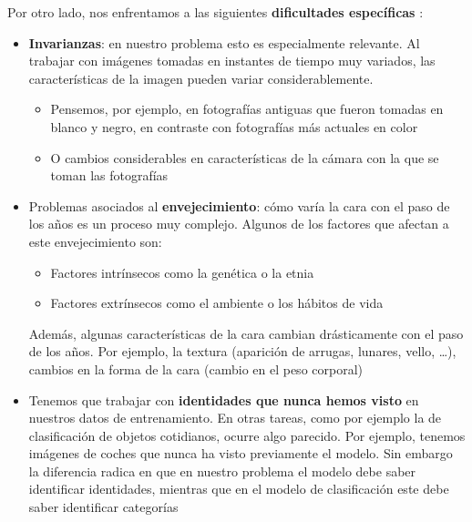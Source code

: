 Por otro lado, nos enfrentamos a las siguientes \textbf{dificultades específicas} \cite{informatica:challenges_retrieval}:

\begin{itemize}
    \item \textbf{Invarianzas}: en nuestro problema esto es especialmente relevante. Al trabajar con imágenes tomadas en instantes de tiempo muy variados, las características de la imagen pueden variar considerablemente.
        \begin{itemize}
            \item Pensemos, por ejemplo, en fotografías antiguas que fueron tomadas en blanco y negro, en contraste con fotografías más actuales en color
            \item O cambios considerables en características de la cámara con la que se toman las fotografías
        \end{itemize}
    \item Problemas asociados al \textbf{envejecimiento}: cómo varía la cara con el paso de los años es un proceso muy complejo. Algunos de los factores que afectan a este envejecimiento \cite{informatica:tecnica_sintesis_aifr} son:
        \begin{itemize}
            \item Factores intrínsecos como la genética o la etnia
            \item Factores extrínsecos como el ambiente o los hábitos de vida
        \end{itemize}
    Además, algunas características de la cara cambian drásticamente con el paso de los años. Por ejemplo, la textura (aparición de arrugas, lunares, vello, \ldots), cambios en la forma de la cara (cambio en el peso corporal)

\item Tenemos que trabajar con \textbf{identidades que nunca hemos visto} en nuestros datos de entrenamiento. En otras tareas, como por ejemplo la de clasificación de objetos cotidianos, ocurre algo parecido. Por ejemplo, tenemos imágenes de coches que nunca ha visto previamente el modelo. Sin embargo la diferencia radica en que en nuestro problema el modelo debe saber identificar identidades, mientras que en el modelo de clasificación este debe saber identificar categorías


\end{itemize}
